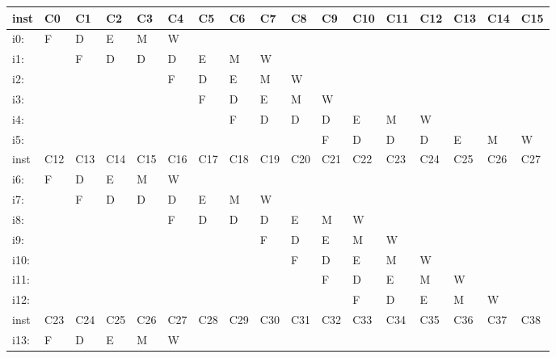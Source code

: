 \documentclass{article}
\begin{document}
\begin{enumerate}
\begin{table}[H]
\begin{tabular}{|l|l|l|l|l|l|l|l|l|l|l|l|l|l|l|l|l|}
\hline
inst & C0  & C1  & C2  & C3  & C4  & C5  & C6  & C7  & C8  & C9  & C10 & C11 & C12 & C13 & C14 & C15 \\ \hline
i0:  &  F  &  D  &  E  &  M  &  W  &     &     &     &     &     &     &     &     &     &     &     \\ \hline
i1:  &     &  F  &  D  &  D  &  D  &  E  &  M  &  W  &     &     &     &     &     &     &     &     \\ \hline
i2:  &     &     &     &     &  F  &  D  &  E  &  M  &  W  &     &     &     &     &     &     &     \\ \hline
i3:  &     &     &     &     &     &  F  &  D  &  E  &  M  &  W  &     &     &     &     &     &     \\ \hline
i4:  &     &     &     &     &     &     &  F  &  D  &  D  &  D  &  E  &  M  &  W  &     &     &     \\ \hline
i5:  &     &     &     &     &     &     &     &     &     &  F  &  D  &  D  &  D  &  E  &  M  &  W  \\ \hline
inst & C12 & C13 & C14 & C15 & C16 & C17 & C18 & C19 & C20 & C21 & C22 & C23 & C24 & C25 & C26 & C27 \\ \hline
i6:  &  F  &  D  &  E  &  M  &  W  &     &     &     &     &     &     &     &     &     &     &     \\ \hline
i7:  &     &  F  &  D  &  D  &  D  &  E  &  M  &  W  &     &     &     &     &     &     &     &     \\ \hline
i8:  &     &     &     &     &  F  &  D  &  D  &  D  &  E  &  M  &  W  &     &     &     &     &     \\ \hline
i9:  &     &     &     &     &     &     &     &  F  &  D  &  E  &  M  &  W  &     &     &     &     \\ \hline
i10: &     &     &     &     &     &     &     &     &  F  &  D  &  E  &  M  &  W  &     &     &     \\ \hline
i11: &     &     &     &     &     &     &     &     &     &  F  &  D  &  E  &  M  &  W  &     &     \\ \hline
i12: &     &     &     &     &     &     &     &     &     &     &  F  &  D  &  E  &  M  &  W  &      \\ \hline
inst & C23 & C24 & C25 & C26 & C27 & C28 & C29 & C30 & C31 & C32 & C33 & C34 & C35 & C36 & C37 & C38 \\ \hline
i13: &  F  &  D  &  E  &  M  &  W  &     &     &     &     &     &     &     &     &     &     &     \\ \hline

\end{tabular}
\end{table}
\end{enumerate}
\end{document}
